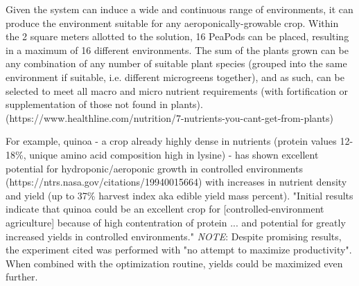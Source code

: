 \documentclass{report}
\begin{document}
Given the system can induce a wide and continuous range of environments, it can produce the environment suitable for any aeroponically-growable crop. Within the 2 square meters allotted to the solution, 16 PeaPods can be placed, resulting in a maximum of 16 different environments. The sum of the plants grown can be any combination of any number of suitable plant species (grouped into the same environment if suitable, i.e. different microgreens together), and as such, can be selected to meet all macro and micro nutrient requirements (with fortification or supplementation of those not found in plants). (https://www.healthline.com/nutrition/7-nutrients-you-cant-get-from-plants)

For example, quinoa - a crop already highly dense in nutrients (protein values 12-18\%, unique amino acid composition high in lysine) - has shown excellent potential for hydroponic/aeroponic growth in controlled environments (https://ntrs.nasa.gov/citations/19940015664) with increases in nutrient density and yield (up to 37\% harvest index aka edible yield mass percent). "Initial results indicate that quinoa could be an excellent crop for [controlled-environment agriculture] because of high contentration of protein ... and potential for greatly increased yields in controlled environments." \textit{NOTE}: Despite promising results, the experiment cited was performed with "no attempt to maximize productivity". When combined with the optimization routine, yields could be maximized even further.
\end{document}

